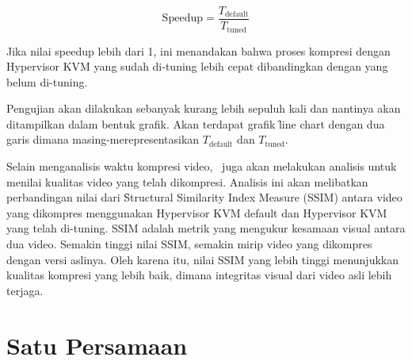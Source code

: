     \[ \mathrm{Speedup} = \frac{T_{\mathrm{default}}}{T_{\mathrm{tuned}}} \]

    Jika nilai speedup lebih dari 1, ini menandakan bahwa proses kompresi dengan Hypervisor KVM yang sudah di-tuning lebih cepat dibandingkan dengan yang belum di-tuning.

    Pengujian akan dilakukan sebanyak kurang lebih sepuluh kali dan nantinya akan ditampilkan dalam bentuk grafik. Akan terdapat grafik \f{line chart} dengan dua garis dimana masing-merepresentasikan $T_{\mathrm{default}}$ dan $T_{\mathrm{tuned}}$.

    Selain menganalisis waktu kompresi video, \saya\ juga akan melakukan analisis untuk menilai kualitas video yang telah dikompresi. Analisis ini akan melibatkan perbandingan nilai dari \f{Structural Similarity Index Measure} (SSIM) antara video yang dikompres menggunakan Hypervisor KVM default dan Hypervisor KVM yang telah di-tuning. SSIM adalah metrik yang mengukur kesamaan visual antara dua video. Semakin tinggi nilai SSIM, semakin mirip video yang dikompres dengan versi aslinya. Oleh karena itu, nilai SSIM yang lebih tinggi menunjukkan kualitas kompresi yang lebih baik, dimana integritas visual dari video asli lebih terjaga.

    \section{Satu Persamaan}

